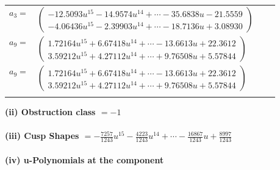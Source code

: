 \documentclass[1p]{elsarticle_modified}
\theoremstyle{definition}
\begin{document}
\begin{tabular}{m{7pt} m{180pt} m{7pt} m{180pt} }
\flushright $a_{3}=$&$\begin{pmatrix}-12.5093 u^{15}-14.9574 u^{14}+\cdots-35.6838 u-21.5559\\-4.06436 u^{15}-2.39903 u^{14}+\cdots-18.7136 u+3.08930\end{pmatrix}$ \\
\flushright $a_{9}=$&$\begin{pmatrix}1.72164 u^{15}+6.67418 u^{14}+\cdots-13.6613 u+22.3612\\3.59212 u^{15}+4.27112 u^{14}+\cdots+9.76508 u+5.57844\end{pmatrix}$\\ \flushright $a_{9}=$&$\begin{pmatrix}1.72164 u^{15}+6.67418 u^{14}+\cdots-13.6613 u+22.3612\\3.59212 u^{15}+4.27112 u^{14}+\cdots+9.76508 u+5.57844\end{pmatrix}$\\&\end{tabular}
\flushleft \textbf{(ii) Obstruction class $= -1$}\\~\\
\flushleft \textbf{(iii) Cusp Shapes $= -\frac{7257}{1243} u^{15}-\frac{4223}{1243} u^{14}+\cdots-\frac{16867}{1243} u+\frac{8997}{1243}$}\\~\\
\newpage\renewcommand{\arraystretch}{1}
\flushleft \textbf{(iv) u-Polynomials at the component}\newline \\
\end{document}
